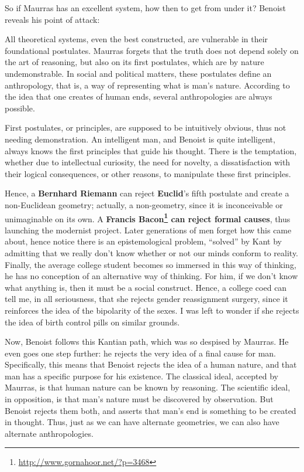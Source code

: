 So if Maurras has an excellent system, how then to get from under it? Benoist reveals his point of attack:


\begin{quotex}
All theoretical systems, even the best constructed, are vulnerable in their foundational postulates. Maurras forgets that the truth does not depend solely on the art of reasoning, but also on its first postulates, which are by nature undemonstrable. In social and political matters, these postulates define an anthropology, that is, a way of representing what is man's nature. According to the idea that one creates of human ends, several anthropologies are always possible.
\end{quotex}


First postulates, or principles, are supposed to be intuitively obvious, thus not needing demonstration. An intelligent man, and Benoist is quite intelligent, always knows the first principles that guide his thought. There is the temptation, whether due to intellectual curiosity, the need for novelty, a dissatisfaction with their logical consequences, or other reasons, to manipulate these first principles.

Hence, a \textbf{Bernhard Riemann} can reject \textbf{Euclid}'s fifth postulate and create a non-Euclidean geometry; actually, a non-geometry, since it is inconceivable or unimaginable on its own. A
\textbf{Francis Bacon\footnote{\url{http://www.gornahoor.net/?p=3468}} can reject formal causes}, thus launching the modernist project. Later generations of men forget how this came about, hence notice there is an epistemological problem, ``solved'' by Kant by admitting that we really don't know whether or not our minds conform to reality. Finally, the average college student becomes so immersed in this way of thinking, he has no conception of an alternative way of thinking. For him, if we don't know what anything is, then it must be a social construct. Hence, a college coed can tell me, in all seriousness, that she rejects gender reassignment surgery, since it reinforces the idea of the bipolarity of the sexes. I was left to wonder if she rejects the idea of birth control pills on similar grounds.

Now, Benoist follows this Kantian path, which was so despised by Maurras. He even goes one step further: he rejects the very idea of a final cause for man. Specifically, this means that Benoist rejects the idea of a human nature, and that man has a specific purpose for his existence. The classical ideal, accepted by Maurras, is that human nature can be known by reasoning. The scientific ideal, in opposition, is that man's nature must be discovered by observation. But Benoist rejects them both, and asserts that man's end is something to be created in thought. Thus, just as we can have alternate geometries, we can also have alternate anthropologies.

